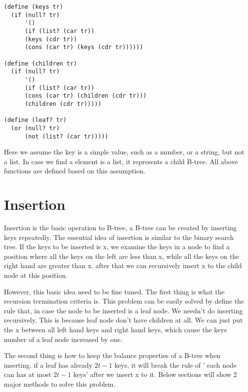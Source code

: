 \documentclass{article}
\begin{document}
\begin{lstlisting}
(define (keys tr)
  (if (null? tr)
      '()
      (if (list? (car tr))
	  (keys (cdr tr))
	  (cons (car tr) (keys (cdr tr))))))

(define (children tr)
  (if (null? tr)
      '()
      (if (list? (car tr))
	  (cons (car tr) (children (cdr tr)))
	  (children (cdr tr)))))

(define (leaf? tr)
  (or (null? tr)
      (not (list? (car tr)))))
\end{lstlisting}

Here we assume the key is a simple value, such as a number, or a string,
but not a list. In case we find a element is a list, it represents a
child B-tree. All above functions are defined based on this assumption.

\section{Insertion}
\label{btree-insertion}
Insertion is the basic operation to B-tree, a B-tree can be created by inserting
keys repeatedly. The essential idea of insertion is similar to the binary
search tree. If the keys to be inserted is x, we examine the keys in a
node to find a position where all the keys on the left are less than x,
while all the keys on the right hand are greater than x. after that
we can recursively insert x to the child node at this position.

However, this basic idea need to be fine tuned. The first thing is what
the recursion termination criteria is. This problem can be easily solved
by define the rule that, in case the node to be inserted is a leaf node.
We needn't do inserting recursively. This is because leaf node don't have
children at all. We can just put the x between all left hand keys and
right hand keys, which cause the keys number of a leaf node increased by one.

The second thing is how to keep the balance properties of a B-tree when
inserting. if a leaf has already $2t-1$ keys, it will break the rule of '
each node can has at most $2t-1$ keys' after we insert x to it. Below
sections will show 2 major methods to solve this problem.

\end{document}
